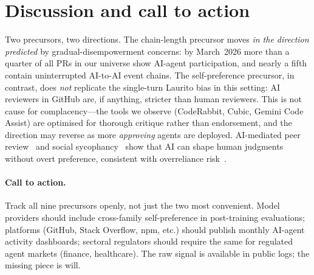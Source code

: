 \documentclass{article}
\begin{document}
\section{Discussion and call to action}
\label{sec:discuss}

Two precursors, two directions. The chain-length precursor moves \emph{in the direction predicted} by gradual-disempowerment concerns: by March~2026 more than a quarter of all PRs in our universe show AI-agent participation, and nearly a fifth contain uninterrupted AI-to-AI event chains. The self-preference precursor, in contrast, does \emph{not} replicate the single-turn Laurito bias in this setting: AI reviewers in GitHub are, if anything, stricter than human reviewers. This is not cause for complacency---the tools we observe (CodeRabbit, Cubic, Gemini Code Assist) are optimised for thorough critique rather than endorsement, and the direction may reverse as more \emph{approving} agents are deployed. AI-mediated peer review~\citep{thakkar2025iclr} and social sycophancy~\citep{cheng2025elephant} show that AI can shape human judgments without overt preference, consistent with overreliance risk~\citep{ibrahim2025anthropomorphic}.

\paragraph{Call to action.} Track all nine precursors openly, not just the two most convenient. Model providers should include cross-family self-preference in post-training evaluations; platforms (GitHub, Stack Overflow, npm, etc.) should publish monthly AI-agent activity dashboards; sectoral regulators should require the same for regulated agent markets (finance, healthcare). The raw signal is available in public logs; the missing piece is will.
\end{document}
